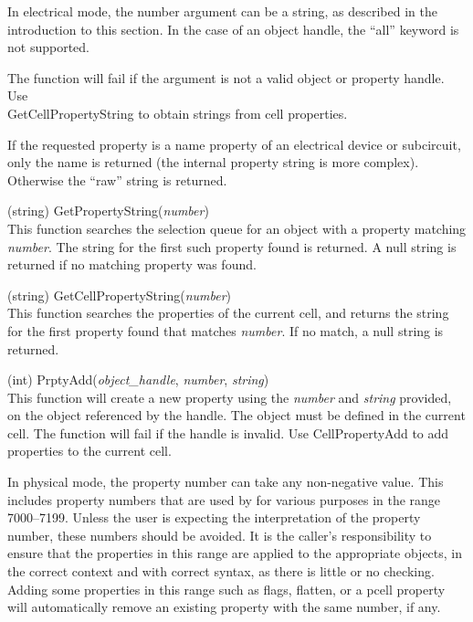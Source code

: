 \begin{description}
In electrical mode, the number argument can be a string, as described
in the introduction to this section.  In the case of an object handle,
the ``{\vt all}'' keyword is not supported.

The function will fail if the argument is not a valid object or
property handle.  Use\\ {\vt GetCellPropertyString} to obtain strings
from cell properties.

If the requested property is a {\et name} property of an electrical
device or subcircuit, only the name is returned (the internal property
string is more complex).  Otherwise the ``raw'' string is returned.

\item{(string) \vt GetPropertyString({\it number\/})}\\
This function searches the selection queue for an object with a
property matching {\it number\/}.  The string for the first such
property found is returned.  A null string is returned if no matching
property was found.

\item{(string) \vt GetCellPropertyString({\it number\/})}\\
This function searches the properties of the current cell, and returns
the string for the first property found that matches {\it number}.  If
no match, a null string is returned.

\item{(int) \vt PrptyAdd({\it object\_handle}, {\it number\/},
 {\it string\/})}\\
This function will create a new property using the {\it number} and
{\it string} provided, on the object referenced by the handle.  The
object must be defined in the current cell.  The function will fail if
the handle is invalid.  Use {\vt CellPropertyAdd} to add properties to
the current cell.

In physical mode, the property number can take any non-negative value. 
This includes property numbers that are used by {\Xic} for various
purposes in the range 7000--7199.  Unless the user is expecting the
{\Xic} interpretation of the property number, these numbers should be
avoided.  It is the caller's responsibility to ensure that the
properties in this range are applied to the appropriate objects, in
the correct context and with correct syntax, as there is little or no
checking.  Adding some properties in this range such as {\et flags},
{\et flatten}, or a pcell property will automatically remove an
existing property with the same number, if any.


\end{description}
